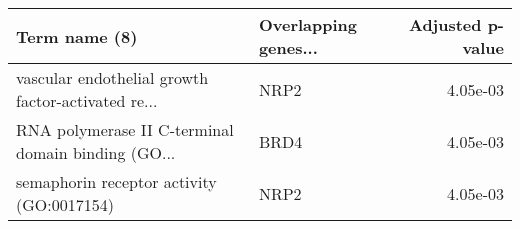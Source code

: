 \begin{tabular}{llr}
\toprule
                                     Term name (8) & Overlapping genes... &  Adjusted p-value \\
\midrule
vascular endothelial growth factor-activated re... &                 NRP2 &          4.05e-03 \\
RNA polymerase II C-terminal domain binding (GO... &                 BRD4 &          4.05e-03 \\
         semaphorin receptor activity (GO:0017154) &                 NRP2 &          4.05e-03 \\
\bottomrule
\end{tabular}
